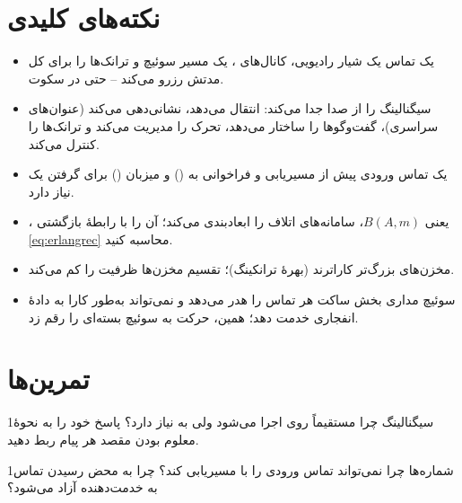 \documentclass[11pt,a4paper]{article}
\begin{document}
\section{نکته‌های کلیدی}
\begin{takeawaybox}
\begin{itemize}
  \item یک تماس  یک شیار رادیویی، کانال‌های ، یک مسیر سوئیچ و ترانک‌ها را
        برای کل مدتش رزرو می‌کند -- حتی در سکوت.
  \item {} سیگنالینگ را از صدا جدا می‌کند:  انتقال می‌دهد،  نشانی‌دهی
        می‌کند (عنوان‌های سراسری)،  گفت‌وگوها را ساختار می‌دهد،  تحرک را
        مدیریت می‌کند و  ترانک‌ها را کنترل می‌کند.
  \item یک تماس ورودی پیش از مسیریابی و فراخوانی به  () و  میزبان
        () برای گرفتن یک  نیاز دارد.
  \item {}، یعنی $B(A,m)$، سامانه‌های اتلاف را ابعادبندی می‌کند؛ آن را با رابطهٔ بازگشتی
        \cref{eq:erlangrec} محاسبه کنید.
  \item مخزن‌های بزرگ‌تر کاراترند (بهرهٔ ترانکینگ)؛ تقسیم مخزن‌ها ظرفیت را کم می‌کند.
  \item سوئیچ مداری بخش ساکت هر تماس را هدر می‌دهد و نمی‌تواند به‌طور کارا به دادهٔ انفجاری
        خدمت دهد؛ همین، حرکت به سوئیچ بسته‌ای را رقم زد.
\end{itemize}
\end{takeawaybox}

\section{تمرین‌ها}

\begin{exercisebox}{1}{سیگنالینگ}\label{exr:ss7}
چرا  مستقیماً روی  اجرا می‌شود ولی  به  نیاز دارد؟
پاسخ خود را به نحوهٔ معلوم بودن مقصد هر پیام ربط دهید.
\end{exercisebox}

\begin{exercisebox}{1}{شماره‌ها}\label{exr:msrn}
چرا  نمی‌تواند تماس ورودی را با  مسیریابی کند؟ چرا  به محض
رسیدن تماس به  خدمت‌دهنده آزاد می‌شود؟
\end{exercisebox}
\end{document}
